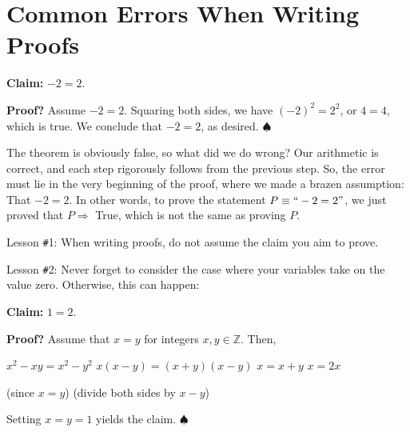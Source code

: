 \documentclass[12pt,a4paper]{article}
\theoremstyle{definition}
\begin{document}
\section*{Common Errors When Writing Proofs}

\textbf{Claim:} $-2=2$.

\bigbreak

\textbf{Proof?} Assume $-2=2$. Squaring both sides, we have $(-2)^2=2^2$, or $4=4$, which is true. We conclude that $-2=2$, as desired. $\spadesuit$

\bigbreak

The theorem is obviously false, so what did we do wrong? Our arithmetic is correct, and each step rigorously follows from the previous step. So, the error must lie in the very beginning of the proof, where we made a brazen assumption: That $-2=2$. In other words, to prove the statement $P\equiv ``-2=2"$, we just proved that $P\Rightarrow$ True, which is not the same as proving $P$.

\bigbreak

Lesson \texttt{\#}1: When writing proofs, do not assume the claim you aim to prove.

\bigbreak

Lesson \texttt{\#}2: Never forget to consider the case where your variables take on the value zero. Otherwise, this can happen:

\bigbreak

\textbf{Claim:} $1=2$.

\bigbreak

\textbf{Proof?} Assume that $x=y$ for integers $x,y\in\mathbb{Z}$. Then,

\bigbreak

\begin{minipage}{0.45\textwidth}
 \begin{center}
 $x^2-xy=x^2-y^2$
 \smallbreak
 $x(x-y)=(x+y)(x-y)$
 \smallbreak
 $x=x+y$
 \smallbreak
 $x=2x$
 \end{center}
\end{minipage}
\hfill
\begin{minipage}{0.45\textwidth}
 \begin{center}
 \vspace{8pt}
 (since $x=y$)
 \smallbreak
 \phantom{space}
 \smallbreak
 (divide both sides by $x-y$)
 \smallbreak
 \phantom{space}
 \end{center}
\end{minipage}

\bigbreak

Setting $x=y=1$ yields the claim. $\spadesuit$
\end{document}
